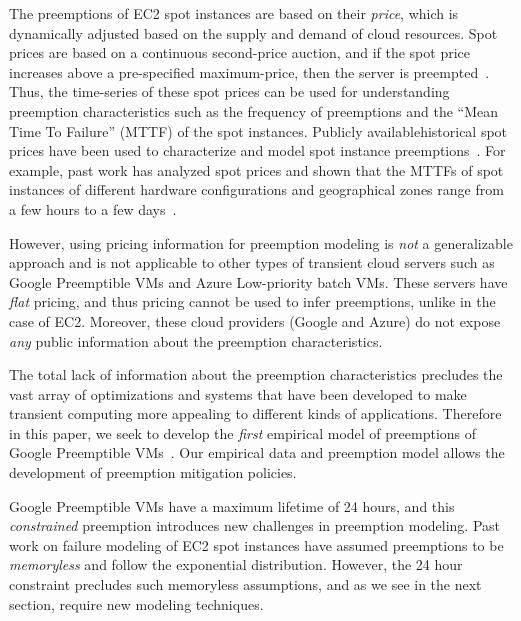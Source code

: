 The preemptions of EC2 spot instances are based on their \emph{price}, which is dynamically adjusted based on the supply and demand of cloud resources.
Spot prices are based on a continuous second-price auction, and if the spot price increases above a pre-specified maximum-price, then the server is preempted~\cite{spot-pricing2}.
%
Thus, the time-series of these spot prices can be used for understanding preemption characteristics such as the frequency of preemptions and the ``Mean Time To Failure'' (MTTF) of the spot instances. 
Publicly available\footnotemark historical spot prices have been used to characterize and model spot instance preemptions~\cite{spotcheck, bid-cloud, tr-guarantees}. %
For example, past work has analyzed spot prices and shown that the MTTFs of spot instances of different hardware configurations and geographical zones range from a few hours to a few days~\cite{wolski_probabilistic_2017, icdcs-spotlight, wolski-new}.

However, using pricing information for preemption modeling is \emph{not} a generalizable approach and is not applicable to other types of transient cloud servers such as Google Preemptible VMs and Azure Low-priority batch VMs.
These servers have \emph{flat} pricing, and thus pricing cannot be used to infer preemptions, unlike in the case of EC2.
Moreover, these cloud providers (Google and Azure) do not expose \emph{any} public information about the preemption characteristics.

The total lack of information about the preemption characteristics precludes the vast array of optimizations and systems that have been developed to make transient computing more appealing to different kinds of applications.
Therefore in this paper, we seek to develop the \emph{first} empirical model of preemptions of Google Preemptible VMs~\cite{pvm}.
Our empirical data and preemption model allows the development of preemption mitigation policies.
%

Google Preemptible VMs have a maximum lifetime of 24 hours, and this \emph{constrained} preemption introduces new challenges in preemption modeling.
Past work on failure modeling of EC2 spot instances have assumed preemptions to be \emph{memoryless} and follow the exponential distribution.
However, the 24 hour constraint precludes such memoryless assumptions, and as we see in the next section, require new modeling techniques.  





